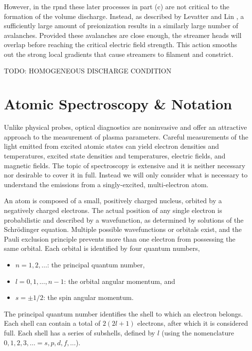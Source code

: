 However, in the \acs{rpnd} these later processes in part (c) are not
critical to the formation of the volume discharge. Instead, as described
by Levatter and Lin \cite{Levatter1980}, a sufficiently large amount of
preionization results in a similarly large number of avalanches.
Provided these avalanches are close enough, the streamer heads will
overlap before reaching the critical electric field strength. This
action smooths out the strong local gradients that cause streamers to
filament and constrict.

TODO: HOMOGENEOUS DISCHARGE CONDITION

\section{Atomic Spectroscopy \& Notation}

Unlike physical probes, optical diagnostics are noninvasive and offer an
attractive approach to the measurement of plasma parameters. Careful
measurements of the light emitted from excited atomic states can yield electron
densities and temperatures, excited state densities and temperatures, electric
fields, and magnetic fields. The topic of spectroscopy is extensive and it is
neither necessary nor desirable to cover it in full. Instead we will only
consider what is necessary to understand the emissions from a singly-excited,
multi-electron atom.

An atom is composed of a small, positively charged nucleus, orbited by a
negatively charged electrons. The actual position of any single electron is
probabilistic and described by a wavefunction, as determined by solutions of the
Schr\"{o}dinger equation. Multiple possible wavefunctions or orbitals exist, and
the Pauli exclusion principle prevents more than one electron from possessing
the same orbital. Each orbital is identified by four quantum numbers,
\begin{itemize}
  \item $n=1,2,\ldots$: the principal quantum number,
  \item $l=0,1,\ldots,n-1$: the orbital angular momentum, and
  \item $s=\pm1/2$: the spin angular momentum.
\end{itemize}
The principal quantum number identifies the shell to which an electron belongs.
Each shell can contain a total of $2(2l+1)$ electrons, after which it is
considered full. Each shell has a series of subshells, defined by $l$ (using the
nomenclature $0,1,2,3,\ldots = s,p,d,f,\ldots$). 

